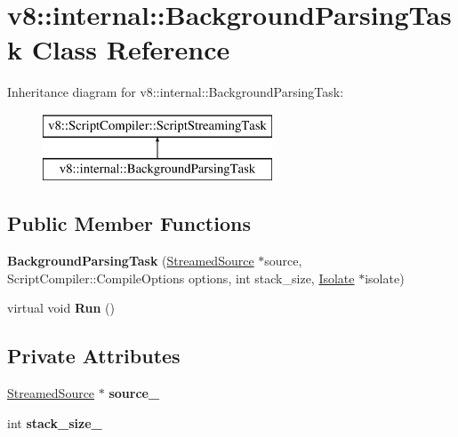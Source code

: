 \hypertarget{classv8_1_1internal_1_1_background_parsing_task}{}\section{v8\+:\+:internal\+:\+:Background\+Parsing\+Task Class Reference}
\label{classv8_1_1internal_1_1_background_parsing_task}
Inheritance diagram for v8\+:\+:internal\+:\+:Background\+Parsing\+Task\+:\begin{figure}[H]
\begin{center}
\leavevmode
\includegraphics[height=2.000000cm]{classv8_1_1internal_1_1_background_parsing_task}
\end{center}
\end{figure}
\subsection*{Public Member Functions}
\begin{DoxyCompactItemize}
\item 
{\bfseries Background\+Parsing\+Task} (\hyperlink{structv8_1_1internal_1_1_streamed_source}{Streamed\+Source} $\ast$source, Script\+Compiler\+::\+Compile\+Options options, int stack\+\_\+size, \hyperlink{classv8_1_1internal_1_1_isolate}{Isolate} $\ast$isolate)\hypertarget{classv8_1_1internal_1_1_background_parsing_task_a64c8625e694fddc66a7e060eebf0ef62}{}\label{classv8_1_1internal_1_1_background_parsing_task_a64c8625e694fddc66a7e060eebf0ef62}

\item 
virtual void {\bfseries Run} ()\hypertarget{classv8_1_1internal_1_1_background_parsing_task_a04e575508cfd903edebc33e5d535e986}{}\label{classv8_1_1internal_1_1_background_parsing_task_a04e575508cfd903edebc33e5d535e986}

\end{DoxyCompactItemize}
\subsection*{Private Attributes}
\begin{DoxyCompactItemize}
\item 
\hyperlink{structv8_1_1internal_1_1_streamed_source}{Streamed\+Source} $\ast$ {\bfseries source\+\_\+}\hypertarget{classv8_1_1internal_1_1_background_parsing_task_ad0ef98b3b401fa78528c8696bf9f96fd}{}\label{classv8_1_1internal_1_1_background_parsing_task_ad0ef98b3b401fa78528c8696bf9f96fd}

\item 
int {\bfseries stack\+\_\+size\+\_\+}\hypertarget{classv8_1_1internal_1_1_background_parsing_task_ac3baa12666162a96d3e4efb48588d0e8}{}\label{classv8_1_1internal_1_1_background_parsing_task_ac3baa12666162a96d3e4efb48588d0e8}

\end{DoxyCompactItemize}



